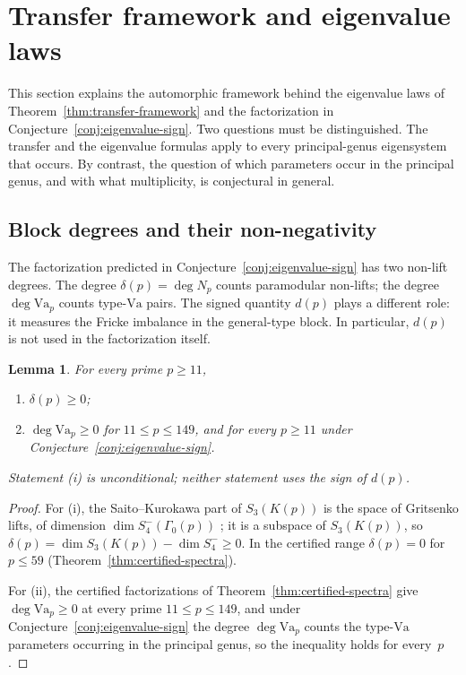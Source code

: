 \documentclass[10pt,a4paper]{amsart}
\newtheorem{lemma}[theorem]{Lemma}
\newcommand{\Va}{\mathrm{Va}}
\providecommand{\Va}{\mathrm{Va}}
\begin{document}
	\section{Transfer framework and eigenvalue laws}
	\label{sec:transfer}
	
	This section explains the automorphic framework behind the eigenvalue laws
	of Theorem~\ref{thm:transfer-framework} and the factorization in
	Conjecture~\ref{conj:eigenvalue-sign}. Two questions must be
	distinguished. The transfer and the eigenvalue formulas apply to every
	principal-genus eigensystem that occurs. By contrast, the question of
	which parameters occur in the principal genus, and with what
	multiplicity, is conjectural in general.
	
	\subsection{Block degrees and their non-negativity}
	\label{ss:block-degrees}
	
	The factorization predicted in
	Conjecture~\ref{conj:eigenvalue-sign} has two non-lift degrees. The degree
	$\delta(p)=\deg N_p$ counts paramodular non-lifts; the degree
	$\deg\Va_p$ counts type-$\Va$ pairs. The signed quantity $d(p)$ plays a
	different role: it measures the Fricke imbalance in the general-type
	block. In particular, $d(p)$ is not used in the factorization itself.
	
	\begin{lemma}\label{lem:positivity}
		For every prime $p\ge11$,
		\begin{enumerate}[label=\textup{(\roman*)},leftmargin=2.3em]
			\item $\delta(p)\ge0$;
			\item $\deg\Va_p\ge0$ for $11\le p\le149$, and for every $p\ge11$
			under Conjecture~\ref{conj:eigenvalue-sign}.
		\end{enumerate}
		Statement \textup{(i)} is unconditional; neither statement uses the
		sign of $d(p)$.
	\end{lemma}
	
	\begin{proof}
		For \textup{(i)}, the Saito--Kurokawa part of $S_3(K(p))$ is the space
		of Gritsenko lifts, of dimension $\dim S_4^{-}(\Gamma_0(p))$
		\cite{Gritsenko1995,IPY2013}; it is a subspace of $S_3(K(p))$, so
		$\delta(p)=\dim S_3(K(p))-\dim S_4^{-}\ge0$. In the certified range
		$\delta(p)=0$ for $p\le59$ (Theorem~\ref{thm:certified-spectra}).
		
		For \textup{(ii)}, the certified factorizations of
		Theorem~\ref{thm:certified-spectra} give $\deg\Va_p\ge0$ at every
		prime $11\le p\le149$, and under
		Conjecture~\ref{conj:eigenvalue-sign} the degree $\deg\Va_p$ counts
		the type-$\Va$ parameters occurring in the principal genus, so the
		inequality holds for every~$p$.
	\end{proof}
	
\end{document}
